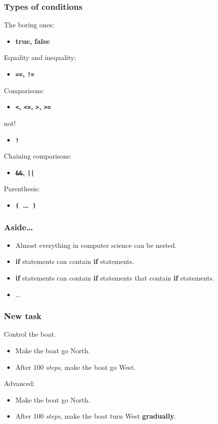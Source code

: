 \documentclass{beamer}
\begin{document}
\begin{frame}[fragile]
\frametitle{Types of conditions}
\large
The boring ones:
\begin{itemize}
\item {\bf true, false}
\end{itemize}

Equality and inequality:
\begin{itemize}
\item {\bf \verb$==$, \verb$!=$}
\end{itemize}

Comparisons:
\begin{itemize}
\item {\bf \verb$<$, \verb$<=$, \verb$>$, \verb$>=$}
\end{itemize}

not!
\begin{itemize}
\item {\bf \verb$!$}
\end{itemize}

Chaining comparisons:
\begin{itemize}
\item {\bf \verb$&&$, \verb$||$}
\end{itemize}

Parenthesis:
\begin{itemize}
\item {\bf \verb$($~\ldots~\verb$)$}
\end{itemize}

\end{frame}

\begin{frame}[fragile]
\frametitle{Aside\ldots}

\begin{itemize}
\item Almost everything in computer science can be nested.
\item {\bf if} statements can contain {\bf if} statements.
\item {\bf if} statements can contain {\bf if} statements that
contain {\bf if} statements.
\item \ldots
\end{itemize}

\end{frame}

\begin{frame}[fragile]
\frametitle{New task}

Control the boat.
\begin{itemize}
\item Make the boat go North.
\item After 100 {\em steps\/}, make the boat go West.
\end{itemize}

\frameskip

Advanced:
\begin{itemize}
\item Make the boat go North.
\item After 100 {\em steps\/}, make the boat turn West {\bf gradually}.
\end{itemize}
\end{frame}
\end{document}
